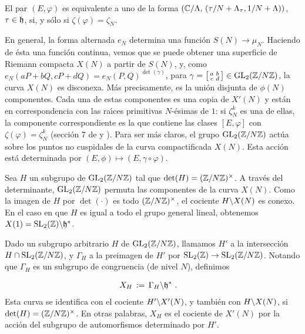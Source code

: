 El par $(E,\varphi)$ es equivalente a uno de la forma
$(\bb{C}/\Lambda,\,(\tau/N+\Lambda_{\tau},1/N+\Lambda))$, $\tau\in\frak{h}$, si,
y s\'{o}lo si $\zeta(\varphi)=\zeta_{N}$.

En general, la forma alternada $e_{N}$ determina una funci\'{o}n
$S(N)\rightarrow\mu_{N}$. Haciendo de \'{e}sta una funci\'{o}n continua, vemos
que se puede obtener una superficie de Riemann compacta $X(N)$ a partir de $S(N)$,
y, como $e_{N}(aP+bQ,cP+dQ)=e_{N}(P,Q)^{\det(\gamma)}$, para
\begin{math}\gamma=
\left[\begin{smallmatrix}a&b\\c&d\end{smallmatrix}\right]\in\GL{2}(\bb{Z}/N\bb{Z})
\end{math}, la curva $X(N)$ es disconexa.
M\'{a}s precisamente, es la uni\'{o}n disjunta de $\phi(N)$ componentes. Cada una
de estas componentes es una copia de $X'(N)$ y est\'{a}n en correspondencia con
las ra\'{\i}ces primitivas $N$-\'{e}simas de $1$: si $\zeta_{N}^{k}$ es una de
ellas, la componente correspondiente es la que contiene las clases $[E,\varphi]$
con $\zeta(\varphi)=\zeta_{N}^{k}$ (secci\'{o}n 7 de \cite{booher} y
\cite{deligneRapoport}).
Para ser m\'{a}s claros, el grupo $\GL{2}(\bb{Z}/N\bb{Z})$ act\'{u}a sobre los
puntos no cuspidales de la curva compactificada $X(N)$. Esta acci\'{o}n est\'{a}
determinada por $(E,\phi)\mapsto(E,\gamma\circ\varphi)$.

Sea $H$ un subgrupo de $\GL{2}(\bb{Z}/N\bb{Z})$ tal que
$\det(H)=(\bb{Z}/N\bb{Z})^{\times}$. A trav\'{e}s del determinante,
$\GL{2}(\bb{Z}/N\bb{Z})$ permuta las componentes de la curva $X(N)$. Como la
imagen de $H$ por $\det(\cdot)$ es todo $(\bb{Z}/N\bb{Z})^{\times}$, el cociente
$H\backs X(N)$ es conexo. En el caso en que $H$ es igual a todo el grupo general
lineal, obtenemos $X(1)=\SL{2}(\bb{Z})\backs\frak{h}^{*}$.

Dado un subgrupo arbitrario $H$ de $\GL{2}(\bb{Z}/N\bb{Z})$, llamamos $H'$ a la
intersecci\'{o}n $H\cap\SL{2}(\bb{Z}/N\bb{Z})$, y $\Gamma_{H}$ a la preimagen de
$H'$ por $\SL{2}(\bb{Z})\rightarrow\SL{2}(\bb{Z}/N\bb{Z})$. Notando que
$\Gamma_{H}$ es un subgrupo de congruencia (de nivel $N$), definimos

\begin{align*}
X_{H} & \,:=\,\Gamma_{H}\backs\frak{h}^{*}\text{ .}
\end{align*}
Esta curva se identifica con el cociente $H'\backs X'(N)$, y tambi\'{e}n con
$H\backs X(N)$, si $\det(H)=(\bb{Z}/N\bb{Z})^{\times}$. En otras palabras, $X_{H}$
es el cociente de $X'(N)$ por la acci\'{o}n del subgrupo de automorfismos
determinado por $H'$.

